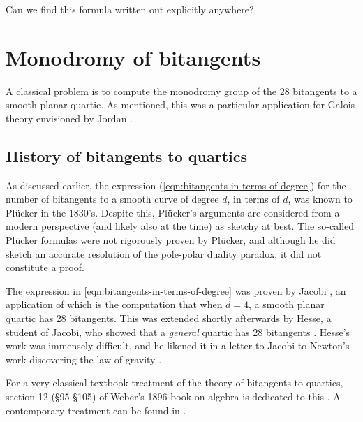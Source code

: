 \documentclass[11pt]{amsart}
\begin{document}
\begin{question} Can we find this formula written out explicitly anywhere?
\end{question}


\section{Monodromy of bitangents}

A classical problem is to compute the monodromy group of the 28 bitangents to a smooth planar quartic. As mentioned, this was a particular application for Galois theory envisioned by Jordan \cite[III.VI]{Jordan}.

\subsection{History of bitangents to quartics}

As discussed earlier, the expression (\autoref{eqn:bitangents-in-terms-of-degree}) for the number of bitangents to a smooth curve of degree $d$, in terms of $d$, was known to Pl\"{u}cker in the 1830's. Despite this, Pl\"{u}cker's arguments are considered from a modern perspective (and likely also at the time) as sketchy at best. The so-called Pl\"{u}cker formulas were not rigorously proven by Pl\"{u}cker, and although he did sketch an accurate resolution of the pole-polar duality paradox, it did not constitute a proof.

The expression in \autoref{eqn:bitangents-in-terms-of-degree} was proven by Jacobi \cite{Jacobi1850}, an application of which is the computation that when $d=4$, a smooth planar quartic has 28 bitangents. This was extended shortly afterwards by Hesse, a student of Jacobi, who showed that a \textit{general} quartic has 28 bitangents \cite{Hesse1855}. Hesse's work was immensely difficult, and he likened it in a letter to Jacobi to Newton's work discovering the law of gravity \cite[p.~165]{Gray-worlds}.

For a very classical textbook treatment of the theory of bitangents to quartics, section 12 (\S95-\S105) of Weber's 1896 book on algebra is dedicated to this \cite[\S95-\S105]{Weber1896}. A contemporary treatment can be found in \cite[\S6.1]{Dolgachev}.
\end{document}
